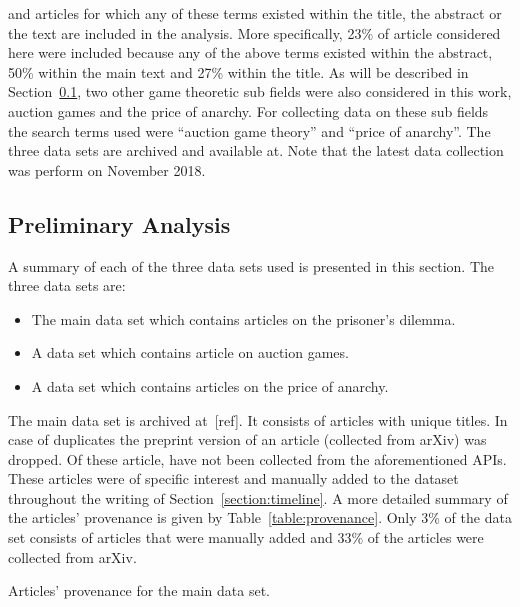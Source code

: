 \documentclass{article}
\theoremstyle{definition}
\newcommand{\totalarticles}{}
\newcommand{\manual}{}
\begin{document}
and articles for which any of these terms existed within the title, the abstract
or the text are included in the analysis. More specifically, 23\% of article
considered here were included because any of the above terms existed within
the abstract, 50\% within the main text and 27\% within the title.
As will be described in Section~\ref{section:preliminary_analysis}, two other
game theoretic sub fields were also considered in this work, auction games and the
price of anarchy. For collecting data on these sub fields the search terms used
were ``auction game theory'' and ``price of anarchy''. The three data sets
are archived and available at. %
Note that the latest data collection was perform on November
2018.%

\subsection{Preliminary Analysis}\label{section:preliminary_analysis}

A summary of each of the three data sets used is presented in this section.
The three data sets are:

\begin{itemize}
    \item The main data set which contains articles on the prisoner's dilemma.
    \item A data set which contains article on auction games.
    \item A data set which contains articles on the price of anarchy.
\end{itemize}

The main data set is archived at~[ref]. It
consists of \totalarticles articles with unique titles. In case of duplicates
the preprint version of an article (collected from arXiv) was dropped.
Of these \totalarticles article, \manual have not been collected from the
aforementioned APIs. These articles were of specific interest and manually added
to the dataset throughout the writing of Section~\ref{section:timeline}. A more
detailed summary of the articles' provenance is given by Table~\ref{table:provenance}.
Only 3\% of the data set consists of articles that were manually added and 33\% of the
articles were collected from arXiv.

\begin{table}[!hbtp]
    \begin{center}
    
    \end{center}
    \caption{Articles' provenance for the main data set.} %
    \label{table:provenance}
\end{table}
\end{document}
